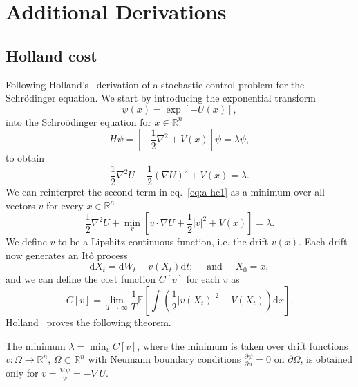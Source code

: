
\chapter{Additional Derivations}

\section{Holland cost}
\label{app:holland-cost}
Following Holland's~\cite{holland1977cost} derivation of a stochastic control problem for the Schr\" odinger equation. We start by introducing the exponential transform
\begin{equation}
	\psi(x)=\exp [-U(x)],
\end{equation}
into the Schro\" odinger equation for $x \in \mathbb{R}^{n}$
\begin{equation}
	H \psi=\left[-\frac{1}{2} \nabla^{2}+V(x)\right] \psi=\lambda \psi,
\end{equation}
to obtain
\begin{equation}
	\label{eq:a-hc1}
	\frac{1}{2} \nabla^{2} U-\frac{1}{2}(\nabla U)^{2}+V(x)=\lambda.
\end{equation}
We can reinterpret the second term in eq.~\eqref{eq:a-hc1} as a minimum over all vectors $v$ for every $x \in \mathbb{R}^{n}$
\begin{equation}
	\label{eq:a-hc2}
	\frac{1}{2} \nabla^{2} U+\min_{v}\left[v \cdot \nabla U+\frac{1}{2}|v|^{2}+V(x)\right]=\lambda.
\end{equation}
We define $v$ to be a Lipshitz continuous function, i.e. the drift $v(x)$. Each drift now generates an It\^ o process
\begin{equation}
	\label{eq:a-hc3}
	\mathrm{d}X_{t}=\mathrm{d}W_{t}+v\left(X_{t}\right) \mathrm{d}t; \quad \text{ and } \quad X_0 = x,
\end{equation}
and we can define the cost function $C[v]$ for each $v$ as
\begin{equation}
	\label{eq:a-hc4}
	C[v]=\lim _{T \rightarrow \infty} \frac{1}{T} \mathbb{E}\left[\int \left(\frac{1}{2}\left|v\left(X_{t}\right)\right|^{2}+V\left(X_{t}\right)\right)\mathrm{d}x \right].
\end{equation}
Holland~\cite{holland1977cost} proves the following theorem.
\begin{theorem}
	The minimum $\lambda = \min_{v} C[v]$, where the minimum is taken over drift functions $v: \Omega \rightarrow \mathbb{R}^n$, $\Omega \subset \mathbb{R}^n$ with Neumann boundary conditions $\frac{\partial \psi}{\partial n}=0 \text{ on } \partial \Omega$, is obtained only for $v=\frac{\nabla \psi}{\psi}=-\nabla U$.
\end{theorem}
